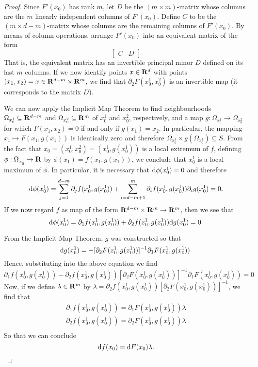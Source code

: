 \begin{proof}
    Since \(F'(x_0)\) has rank \(m\), let \(D\) be the \((m \times m)\)-matrix whose
    columns are the \(m\) linearly independent columns of \(F'(x_0)\). Define
    \(C\) to be the \((m \times d - m)\)-matrix whose columns are the remaining columns
    of \(F'(x_0)\). By means of column operations, arrange \(F'(x_0)\) into an
    equivalent matrix of the form
    \[
        \begin{bmatrix}
            C & D
        \end{bmatrix}
    \]
    That is, the equivalent matrix has an invertible principal minor \(D\) defined
    on its last \(m\) columns. If we now identify points \(x \in \mathbf{R}^d\) with points
    \((x_1, x_2) = x \in \mathbf{R}^{d-m} \times \mathbf{R}^m\), we find that \(\partial_2 F(x_0^1, x_0^2)\) is an
    invertible map (it corresponds to the matrix \(D\)).

    We can now apply the Implicit Map Theorem to find neighbourhoods \(\Omega_{x_{0}^1}
    \subseteq \mathbf{R}^{d-m}\) and \(\Omega_{x_0^2} \subseteq \mathbf{R}^m\) of \(x_0^1\) and \(x_0^2\), respectively,
    and a map \(g: \Omega_{x_0^1} \to \Omega_{x_0^2}\) for which \(F(x_{1}, x_2) = 0\) if and
    only if \(g(x_1) = x_2\). In particular, the mapping \(x_1 \mapsto F(x_1, g(x_1))\)
    is identically zero and therefore \(\Omega_{x_0^1} \times g(\Omega_{x_0^1}) \subseteq S\). From the
    fact that \(x_0 = (x_0^1, x_0^2) = (x_0^1, g(x_0^1))\) is a local extremum of
    \(f\), defining \(\phi: \Omega_{x_0^{1}} \to \mathbf{R}\) by \(\phi(x_1) = f(x_1, g(x_1))\), we
    conclude that \(x_0^1\) is a local maximum of \(\phi\). In particular, it is
    necessary that \(\mathrm{d} \phi(x_0^1) = 0\) and therefore
    \[
        \mathrm{d} \phi(x_0^{1}) = \sum_{j=1}^{d-m} \partial_j f(x_0^1, g(x_0^1)) + \sum_{i = d - m +
            1}^{m} \partial_i f(x_0^1, g(x_0^1)) \partial_i g(x_0^1) = 0.
    \]
    If we now regard \(f\) as map of the form \(\mathbf{R}^{d-m} \times \mathbf{R}^m \to \mathbf{R}^m\), then we
    see that
    \[
        \mathrm{d} \phi(x_0^1) = \partial_1 f(x_0^1, g(x_0^1)) + \partial_{2} f(x_0^1, g(x_0^1)) \mathrm{d}
        g(x_0^1) = 0.
    \]

    From the Implicit Map Theorem, \(g\) was constructed so that
    \[
        \mathrm{d} g(x_0^1) = - [\partial_2F(x_0^1, g(x_0^1))]^{-1} \partial_1 F(x_0^1, g(x_{0}^1)).
    \]
    Hence, substituting into the above equation we find
    \[
        \partial_1 f(x_0^1, g(x_0^1)) - \partial_2 f(x_0^1, g(x_0^1)) [\partial_2 F(x_0^1,
                g(x_0^1))]^{-1} \partial_1 F(x_0^1, g(x_0^1)) = 0
    \]
    Now, if we define \(\lambda \in \mathbf{R}^m\) by \(\lambda = \partial_2f(x_0^{1}, g(x_{0}^{1})) [\partial_2
            F(x_{0}^1, g(x_0^1))]^{-1}\), we find that
    \begin{gather*}
        \partial_1 f(x_0^{1}, g(x_0^1)) = \partial_1 F(x_0^1, g(x_0^1)) \lambda \\
        \partial_2 f(x_0^{1}, g(x_0^1)) = \partial_2 F(x_0^1, g(x_0^1)) \lambda \\
    \end{gather*}
    So that we can conclude
    \[
        \mathrm{d} f(x_0) = \mathrm{d} F(x_0) \lambda.
    \]
\end{proof}

